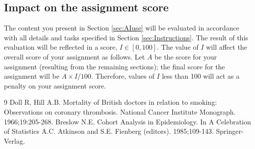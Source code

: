 \documentclass[10pt,a4paper,twoside]{article}\usepackage[]{graphicx}\usepackage[]{xcolor}
\begin{document}
\subsection{Impact on the assignment score}
The content you present in Section \ref{sec:AIuse} will be evaluated in accordance with all details and tasks specified in Section \ref{sec:Instructions}. The result of this evaluation will be reflected in a score,
$I \in [0, 100]$. The value of $I$ will affect the overall score of your assignment as follows. Let $A$ be the score for your assignment (resulting from the remaining sections); the final score for the assignment will be $A \times I/100$. Therefore, values of $I$ less than 100 will act as a
penalty on your assignment score.



\newpage
\begin{thebibliography}{9}
 Doll R, Hill A.B. Mortality of British doctors in relation to smoking: Observations on coronary thrombosis. National Cancer Institute Monograph. 1966;19:205-268.
 Breslow N.E. Cohort Analysis in Epidemiology. In A Celebration of Statistics A.C. Atkinson and S.E. Fienberg (editors). 1985;109-143. Springer-Verlag.
\end{thebibliography}
\end{document}
